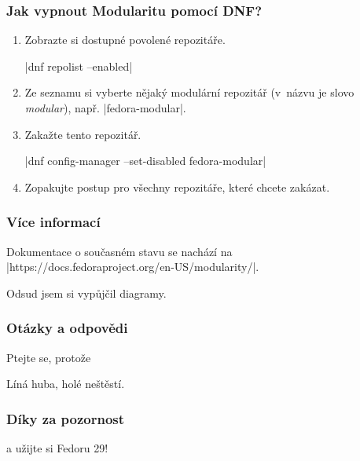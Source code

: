 \documentclass[12pt]{beamer}
\begin{document}
\begin{frame}[fragile]
\frametitle{Jak vypnout Modularitu pomocí DNF?}

\begin{enumerate}
	\item Zobrazte si dostupné povolené repozitáře.
	
	\tc|dnf repolist --enabled|
	\item Ze seznamu si vyberte nějaký modulární repozitář (v~názvu je slovo \textit{modular}), např. \tc|fedora-modular|.
	\item Zakažte tento repozitář.
	
	\tc|dnf config-manager --set-disabled fedora-modular|
	\item Zopakujte postup pro všechny repozitáře, které chcete zakázat.
\end{enumerate}
\end{frame}

\begin{frame}[fragile]
\frametitle{Více informací}
	Dokumentace o současném stavu se nachází na \tc|https://docs.fedoraproject.org/en-US/modularity/|.
	
	Odsud jsem si vypůjčil diagramy.
\end{frame}

\begin{frame}
\frametitle{Otázky a odpovědi}

Ptejte se, protože

\begin{center}
	\Huge{Líná huba, holé neštěstí.}
\end{center}
\end{frame}

\begin{frame}
\frametitle{Díky za pozornost}
\begin{center}
	\Huge{a užijte si Fedoru 29!}
\end{center}
\end{frame}
\end{document}
